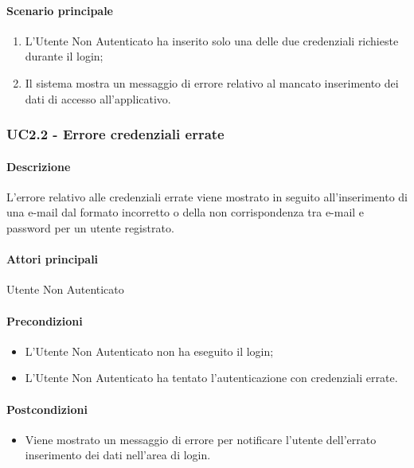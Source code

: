 \paragraph*{Scenario principale}
\begin{enumerate}
  \item L’Utente Non Autenticato ha inserito solo una delle due credenziali richieste durante il login;
  \item Il sistema mostra un messaggio di errore relativo al mancato inserimento dei dati di accesso all’applicativo.   
\end{enumerate}


\subsubsection{UC2.2 - Errore credenziali errate}\label{UC2point2}
\paragraph*{Descrizione}
L’errore relativo alle credenziali errate viene mostrato in seguito all’inserimento di una e-mail dal formato incorretto o della non corrispondenza tra e-mail e password per un utente registrato.

\paragraph*{Attori principali}
Utente Non Autenticato

\paragraph*{Precondizioni}
\begin{itemize}
  \item L’Utente Non Autenticato non ha eseguito il login;
  \item L’Utente Non Autenticato ha tentato l’autenticazione con credenziali errate.  
\end{itemize}

\paragraph*{Postcondizioni}
\begin{itemize}
  \item Viene mostrato un messaggio di errore per notificare l’utente dell’errato inserimento dei dati nell’area di login.
\end{itemize}

